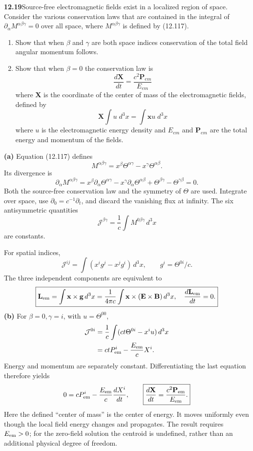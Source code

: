 \par\bigskip
\noindent\textbf{12.19}\quad Source-free electromagnetic fields exist in a localized region of space. Consider the various conservation laws that are contained in the integral of $\partial_{\alpha}M^{\alpha\beta\gamma}=0$ over all space, where $M^{\alpha\beta\gamma}$ is defined by (12.117).
\begin{enumerate}
\item[(a)] Show that when $\beta$ and $\gamma$ are both space indices conservation of the total field angular momentum follows.
\item[(b)] Show that when $\beta=0$ the conservation law is
\[
\frac{d\mathbf{X}}{dt}=\frac{c^{2}\mathbf{P}_{em}}{E_{em}}
\]
where $\mathbf{X}$ is the coordinate of the center of mass of the electromagnetic fields, defined by
\[
\mathbf{X}\int u\;d^{3}x=\int\mathbf{x}u\;d^{3}x
\]
where $u$ is the electromagnetic energy density and $E_{em}$ and $\mathbf{P}_{em}$ are the total energy and momentum of the fields.
\end{enumerate}
\solution

\medskip\noindent\textbf{(a)} Equation (12.117) defines
\[
M^{\alpha\beta\gamma}
=x^\beta\Theta^{\alpha\gamma}-x^\gamma\Theta^{\alpha\beta}.
\]
Its divergence is
\[
\partial_\alpha M^{\alpha\beta\gamma}
=x^\beta\partial_\alpha\Theta^{\alpha\gamma}
-x^\gamma\partial_\alpha\Theta^{\alpha\beta}
+\Theta^{\beta\gamma}-\Theta^{\gamma\beta}=0.
\]
Both the source-free conservation law and the symmetry of $\Theta$
are used.  Integrate over space, use $\partial_0=c^{-1}\partial_t$,
and discard the vanishing flux at infinity.  The six antisymmetric
quantities
\[
\mathcal J^{\beta\gamma}=\frac1c\int M^{0\beta\gamma}\,d^3x
\]
are constants.

For spatial indices,
\[
\mathcal J^{ij}=\int(x^ig^j-x^jg^i)\,d^3x,
\qquad g^i=\Theta^{0i}/c.
\]
The three independent components are equivalent to
\[
\boxed{\mathbf L_{\rm em}=\int\mathbf x\times\mathbf g\,d^3x
=\frac1{4\pi c}\int\mathbf x\times(\mathbf E\times\mathbf B)\,d^3x,
\quad \frac{d\mathbf L_{\rm em}}{dt}=0.}
\]
\medskip\noindent\textbf{(b)} For $\beta=0,\gamma=i$, with $u=\Theta^{00}$,
\begin{align*}
\mathcal J^{0i}
&=\frac1c\int(ct\Theta^{0i}-x^iu)\,d^3x\\
&=ctP_{\rm em}^i-\frac{E_{\rm em}}cX^i.
\end{align*}
Energy and momentum are separately constant.  Differentiating the
last equation therefore yields
\[
0=cP_{\rm em}^i-\frac{E_{\rm em}}c\frac{dX^i}{dt},
\qquad
\boxed{\frac{d\mathbf X}{dt}=\frac{c^2\mathbf P_{\rm em}}{E_{\rm em}}.}
\]
Here the defined ``center of mass'' is the center of energy.
It moves uniformly even though the local field energy changes and
propagates.  The result requires $E_{\rm em}>0$; for the zero-field
solution the centroid is undefined, rather than an additional
physical degree of freedom.

